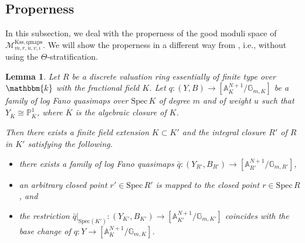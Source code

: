 \documentclass[12pt,twoside]{amsart}
\newtheorem{lem}[thm]{Lemma}
\theoremstyle{definition}
\begin{document}
\subsection{Properness}
In this subsection, we deal with the properness of the good moduli space of $\mathcal{M}^{\mathrm{Kss,qmaps}}_{m,r,u,v,\iota}$.
We will show the properness in a different way from \cite{BHLLX}, i.e., without using the $\Theta$-stratification.


\begin{lem}\label{lem--properness}
    Let $R$ be a discrete valuation ring essentially of finite type over $\mathbbm{k}$ with the fractional field $K$.
    Let $q\colon (Y,B)\to[\mathbb{A}^{N+1}_K/\mathbb{G}_{m,K}]$ be a family of log Fano quasimaps over $\mathrm{Spec}\,K$ of degree $m$ and of weight $u$ such that $Y_{\overline{K}}\cong\mathbb{P}^1_{\overline{K}}$, where $\overline{K}$ is the algebraic closure of $K$. 


Then there exists a finite field extension $K\subset K'$ and the integral closure $R'$ of $R$ in $K'$ satisfying the following.

 
    \begin{itemize}
    \item there exists a family of log Fano quasimaps $\bar{q}\colon (Y_{R'},B_{R'})\to [\mathbb{A}^{N+1}_{R'}/\mathbb{G}_{m,R'}]$,
    \item an arbitrary closed point $r'\in\mathrm{Spec}\,R'$ is mapped to the closed point $r\in\mathrm{Spec}\,R$, and
    \item the restriction $\bar{q}|_{\mathrm{Spec}(K')}\colon (Y_{K'},B_{K'})\to [\mathbb{A}^{N+1}_{K'}/\mathbb{G}_{m,K'}]$ coincides with the base change of $q\colon Y\to[\mathbb{A}^{N+1}_K/\mathbb{G}_{m,K}]$. 
    \end{itemize}
\end{lem}
\end{document}
